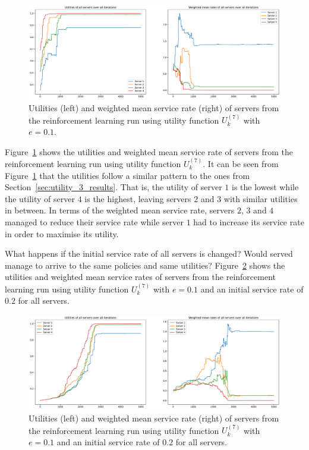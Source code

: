 \begin{figure}[H]
    \includegraphics[width=\textwidth]{chapters/06_agent_based_extension/Bin/reinforcement_learning_results/utility_7/u7_4_e01.pdf}
    \caption{Utilities (left) and weighted mean service rate (right) of servers
    from the reinforcement learning run using utility function \(U_k^{(7)}\)
    with \(e = 0.1\).}
    \label{fig:RL_utility7_4_e01}
\end{figure}

Figure~\ref{fig:RL_utility7_4_e01} shows the utilities and weighted mean
service rate of servers from the reinforcement learning run using utility
function \(U_k^{(7)}\).
It can be seen from Figure~\ref{fig:RL_utility7_4_e01} that the utilities
follow a similar pattern to the ones from Section~\ref{sec:utility_3_results}.
That is, the utility of server \(1\) is the lowest while the utility of server
\(4\) is the highest, leaving servers \(2\) and \(3\) with similar utilities
in between.
In terms of the weighted mean service rate, servers \(2\), \(3\) and \(4\)
managed to reduce their service rate while server \(1\) had to increase its
service rate in order to maximise its utility.

What happens if the initial service rate of all servers is changed?
Would served manage to arrive to the same policies and same utilities?
Figure~\ref{fig:RL_utility7_4_e01_initial_02} shows the utilities and weighted
mean service rates of servers from the reinforcement learning run using utility
function \(U_k^{(7)}\) with \(e = 0.1\) and an initial service rate of
\(0.2\) for all servers.

\begin{figure}[H]
    \includegraphics[width=\textwidth]{chapters/06_agent_based_extension/Bin/reinforcement_learning_results/utility_7/u7_4_e01_initial_02.pdf}
    \caption{Utilities (left) and weighted mean service rate (right) of servers
    from the reinforcement learning run using utility function \(U_k^{(7)}\)
    with \(e = 0.1\) and an initial service rate of \(0.2\) for all servers.}
    \label{fig:RL_utility7_4_e01_initial_02}
\end{figure}


